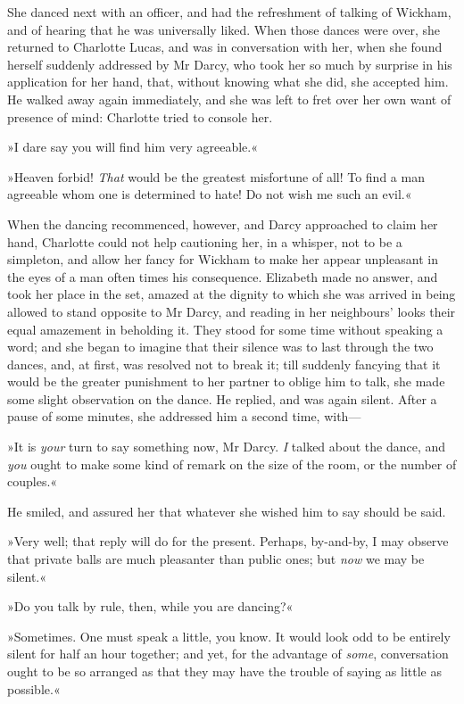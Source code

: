 She danced next with an officer, and had the refreshment of talking of Wickham, and of hearing that he was universally liked. When those dances were over, she returned to Charlotte Lucas, and was in conversation with her, when she found herself suddenly addressed by Mr Darcy, who took her so much by surprise in his application for her hand, that, without knowing what she did, she accepted him. He walked away again immediately, and she was left to fret over her own want of presence of mind: Charlotte tried to console her.

»I dare say you will find him very agreeable.«

»Heaven forbid! \textit{That} would be the greatest misfortune of all! To find a man agreeable whom one is determined to hate! Do not wish me such an evil.«

When the dancing recommenced, however, and Darcy ap\-proached to claim her hand, Charlotte could not help cautioning her, in a whisper, not to be a simpleton, and allow her fancy for Wickham to make her appear unpleasant in the eyes of a man often times his consequence. Elizabeth made no answer, and took her place in the set, amazed at the dignity to which she was arrived in being allowed to stand opposite to Mr Darcy, and reading in her neighbours' looks their equal amazement in beholding it. They stood for some time without speaking a word; and she began to imagine that their silence was to last through the two dances, and, at first, was resolved not to break it; till suddenly fancying that it would be the greater punishment to her partner to oblige him to talk, she made some slight observation on the dance. He replied, and was again silent. After a pause of some minutes, she addressed him a second time, with—

»It is \textit{your} turn to say something now, Mr Darcy. \textit{I} talked about the dance, and \textit{you} ought to make some kind of remark on the size of the room, or the number of couples.«

He smiled, and assured her that whatever she wished him to say should be said.

»Very well; that reply will do for the present. Perhaps, by-and-by, I may observe that private balls are much pleasanter than public ones; but \textit{now} we may be silent.«

»Do you talk by rule, then, while you are dancing?«

»Sometimes. One must speak a little, you know. It would look odd to be entirely silent for half an hour together; and yet, for the advantage of \textit{some}, conversation ought to be so arranged as that they may have the trouble of saying as little as possible.«

